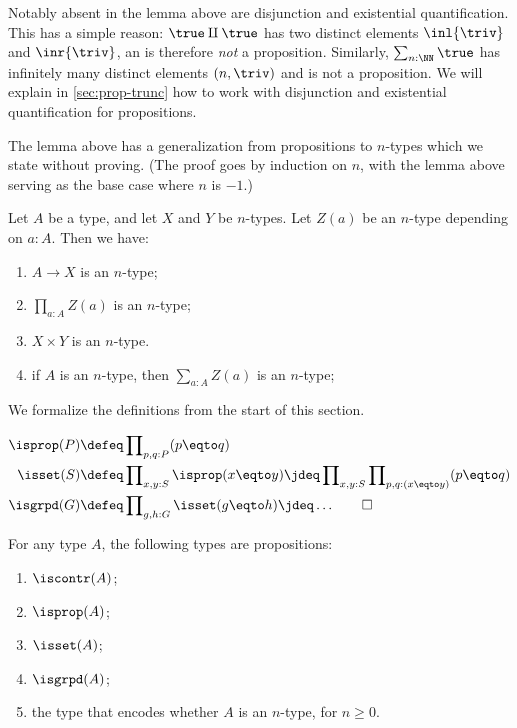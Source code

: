 Notably absent in the lemma above are disjunction
and existential quantification. This has a simple reason:
$\true\amalg \true$ has two distinct elements
$\inl{\triv}$ and $\inr{\triv}$, an is therefore \emph{not} a proposition.
Similarly, $\sum_{n:\NN} \true$ has infinitely many
distinct elements $(n,\triv)$ and is not a proposition. We will explain
in \cref{sec:prop-trunc} how to work with disjunction and
existential quantification for propositions.

The lemma above has a generalization from propositions to
$n$-types which we state without proving.
(The proof goes by induction on $n$, with the lemma above serving as the base case where $n$ is $-1$.)

\begin{lemma}\label{lem:level-n-utils}
Let $A$ be a type, and let $X$ and $Y$ be $n$-types.
Let $Z(a)$ be an $n$-type depending on $a:A$. Then we have:

\begin{enumerate}
\item\label{level-n-utils-codom} $A\to X$ is an $n$-type;
\item\label{level-n-utils-pi} $\prod_{a:A} Z(a)$ is an $n$-type;
\item\label{level-n-utils-times} $X\times Y$ is an $n$-type.
\item\label{level-n-utils-sum} if $A$ is an $n$-type, then $\sum_{a:A} Z(a)$ is an $n$-type;
\end{enumerate}
\end{lemma}

We formalize the definitions from the start of this section.
\begin{definition}\label{def:isSet}
\begin{align*}
\isprop(P) &\defeq\prod\nolimits_{p,q:P}(p \eqto q)\\
\isset(S) &\defeq\prod\nolimits_{x,y:S}\isprop(x \eqto y)\jdeq
                  \prod\nolimits_{x,y:S}\prod\nolimits_{p,q:(x \eqto y)}(p \eqto q)\\
\isgrpd(G) &\defeq\prod\nolimits_{g,h:G}\isset(g \eqto h)\jdeq \ldots\qedhere
\end{align*}
\end{definition}
\begin{lemma}\label{lem:isX-is-prop}
  For any type $A$, the following types are propositions:
  \begin{enumerate}
    \item $\iscontr(A)$;
    \item $\isprop(A)$;
    \item $\isset(A)$;
    \item $\isgrpd(A)$;
    \item the type that encodes whether $A$ is an $n$-type, for $n \ge 0$.
  \end{enumerate}
\end{lemma}

